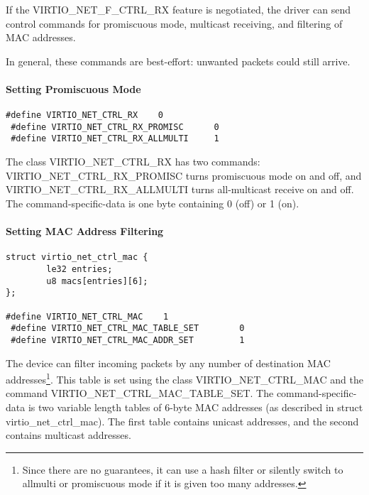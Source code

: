 If the VIRTIO_NET_F_CTRL_RX feature is negotiated, the driver can
send control commands for promiscuous mode, multicast receiving,
and filtering of MAC addresses.

\begin{note}
In general, these commands are best-effort: unwanted
packets could still arrive.
\end{note}

\paragraph{Setting Promiscuous Mode}\label{sec:Device Types / Network Device / Device Operation / Control Virtqueue / Setting Promiscuous Mode}

\begin{lstlisting}
#define VIRTIO_NET_CTRL_RX    0
 #define VIRTIO_NET_CTRL_RX_PROMISC      0
 #define VIRTIO_NET_CTRL_RX_ALLMULTI     1
\end{lstlisting}

The class VIRTIO_NET_CTRL_RX has two commands:
VIRTIO_NET_CTRL_RX_PROMISC turns promiscuous mode on and off, and
VIRTIO_NET_CTRL_RX_ALLMULTI turns all-multicast receive on and
off. The command-specific-data is one byte containing 0 (off) or
1 (on).

\paragraph{Setting MAC Address Filtering}\label{sec:Device Types / Network Device / Device Operation / Control Virtqueue / Setting MAC Address Filtering}

\begin{lstlisting}
struct virtio_net_ctrl_mac {
        le32 entries;
        u8 macs[entries][6];
};

#define VIRTIO_NET_CTRL_MAC    1
 #define VIRTIO_NET_CTRL_MAC_TABLE_SET        0
 #define VIRTIO_NET_CTRL_MAC_ADDR_SET         1
\end{lstlisting}

The device can filter incoming packets by any number of destination
MAC addresses\footnote{Since there are no guarantees, it can use a hash filter or
silently switch to allmulti or promiscuous mode if it is given too
many addresses.
}. This table is set using the class
VIRTIO_NET_CTRL_MAC and the command VIRTIO_NET_CTRL_MAC_TABLE_SET. The
command-specific-data is two variable length tables of 6-byte MAC
addresses (as described in struct virtio_net_ctrl_mac). The first table contains unicast addresses, and the second
contains multicast addresses.

